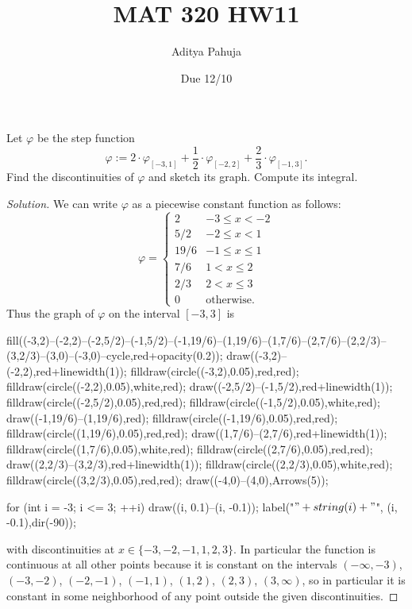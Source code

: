 \documentclass[11pt]{scrartcl}
\title{\vspace{-2em}MAT 320 HW11}
\author{\large Aditya Pahuja}
\date{\large Due 12/10}
\newenvironment{soln}{\begin{proof}[Solution]}{\end{proof}}
\begin{document}
\maketitle

\begin{problem}
	Let $\varphi$ be the step function
	\[\varphi := 2\cdot\varphi_{[-3,1]} + \frac12\cdot \varphi_{[-2,2]}
	+ \frac23\cdot\varphi_{[-1,3]}.\]
	Find the discontinuities of $\varphi$ and sketch its graph.
	Compute its integral.
\end{problem}

\begin{soln}
	We can write $\varphi$ as a piecewise constant function as follows:
	\[\varphi = \begin{cases}
		2 & -3 \le x < -2\\
		5/2 & -2\le x < 1\\
		19/6 & -1 \le x \le 1\\
		7/6 & 1 < x \le 2\\
		2/3 & 2 < x \le 3\\
		0 & \text{otherwise}.
	\end{cases}\]
	Thus the graph of $\varphi$ on the interval $[-3,3]$ is
	\begin{center}
		\begin{asy}
			fill((-3,2)--(-2,2)--(-2,5/2)--(-1,5/2)--(-1,19/6)--(1,19/6)--(1,7/6)--(2,7/6)--(2,2/3)--(3,2/3)--(3,0)--(-3,0)--cycle,red+opacity(0.2));
			draw((-3,2)--(-2,2),red+linewidth(1));
			filldraw(circle((-3,2),0.05),red,red);
			filldraw(circle((-2,2),0.05),white,red);
			draw((-2,5/2)--(-1,5/2),red+linewidth(1));
			filldraw(circle((-2,5/2),0.05),red,red);
			filldraw(circle((-1,5/2),0.05),white,red);
			draw((-1,19/6)--(1,19/6),red);
			filldraw(circle((-1,19/6),0.05),red,red);
			filldraw(circle((1,19/6),0.05),red,red);
			draw((1,7/6)--(2,7/6),red+linewidth(1));
			filldraw(circle((1,7/6),0.05),white,red);
			filldraw(circle((2,7/6),0.05),red,red);
			draw((2,2/3)--(3,2/3),red+linewidth(1));
			filldraw(circle((2,2/3),0.05),white,red);
			filldraw(circle((3,2/3),0.05),red,red);
			draw((-4,0)--(4,0),Arrows(5));
			
			for (int i = -3; i <= 3; ++i) {
				draw((i, 0.1)--(i, -0.1));
				label("$" + string(i) + "$", (i, -0.1),dir(-90));
			}
		\end{asy}
	\end{center}
	with discontinuities at $x\in\{-3, -2, -1, 1, 2, 3\}$.
	In particular the function is continuous at all other points because
	it is constant on the intervals $(-\infty, -3)$,
	$(-3, -2)$, $(-2, -1)$, $(-1, 1)$, $(1, 2)$, $(2, 3)$, $(3, \infty)$,
	so in particular it is constant in some neighborhood of any point
	outside the given discontinuities.
	

\end{soln}
\end{document}
